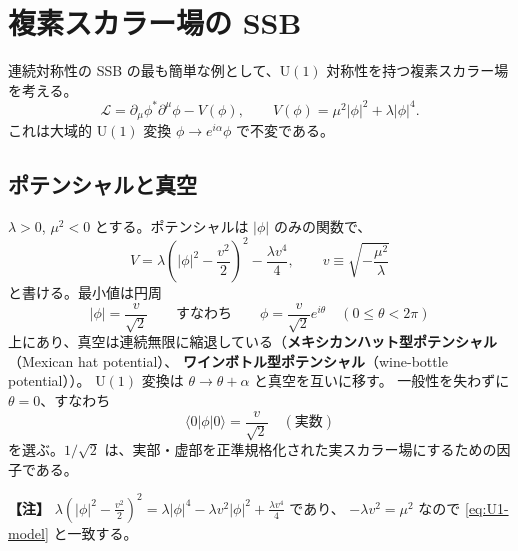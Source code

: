 \documentclass[uplatex,dvipdfmx,a4paper,11pt,openany]{jsbook}
\newcommand{\term}[2]{\textbf{#1}（#2）}
\newenvironment{note}{\vspace{1ex}\par\footnotesize\noindent\textbf{【注】}}{\par\vspace{1ex}}
\numberwithin{equation}{chapter}
\theoremstyle{definition}
\theoremstyle{plain}
\theoremstyle{remark}
\newcommand{\Lag}{\mathcal{L}}
\newcommand{\U}{\mathrm{U}}
\begin{document}
\section{複素スカラー場の SSB}
\label{sec:complex-SSB}
連続対称性の SSB の最も簡単な例として、$\U(1)$ 対称性を持つ複素スカラー場を考える。
\begin{equation}
\Lag=\partial_\mu\phi^*\partial^\mu\phi-V(\phi),\qquad
V(\phi)=\mu^2|\phi|^2+\lambda|\phi|^4 .
\label{eq:U1-model}
\end{equation}
これは大域的 $\U(1)$ 変換 $\phi\to e^{i\alpha}\phi$ で不変である。
\subsection{ポテンシャルと真空}
$\lambda>0$, $\mu^2<0$ とする。ポテンシャルは $|\phi|$ のみの関数で、
\begin{equation}
V=\lambda\left(|\phi|^2-\frac{v^2}{2}\right)^2-\frac{\lambda v^4}{4},
\qquad v\equiv\sqrt{-\frac{\mu^2}{\lambda}}
\label{eq:mexican-hat}
\end{equation}
と書ける。最小値は円周
\begin{equation}
|\phi|=\frac{v}{\sqrt2}
\qquad\text{すなわち}\qquad
\phi=\frac{v}{\sqrt2}e^{i\theta}\quad(0\le\theta<2\pi)
\end{equation}
上にあり、真空は連続無限に縮退している（\term{メキシカンハット型ポテンシャル}{Mexican hat potential}、
\term{ワインボトル型ポテンシャル}{wine-bottle potential}）。
$\U(1)$ 変換は $\theta\to\theta+\alpha$ と真空を互いに移す。
一般性を失わずに $\theta=0$、すなわち
\begin{equation}
\langle0|\phi|0\rangle=\frac{v}{\sqrt2}\quad(\text{実数})
\end{equation}
を選ぶ。$1/\sqrt2$ は、実部・虚部を正準規格化された実スカラー場にするための因子である。
\begin{note}
$\lambda(|\phi|^2-\frac{v^2}{2})^2=\lambda|\phi|^4-\lambda v^2|\phi|^2+\frac{\lambda v^4}{4}$ であり、
$-\lambda v^2=\mu^2$ なので \eqref{eq:U1-model} と一致する。
\end{note}
\end{document}
